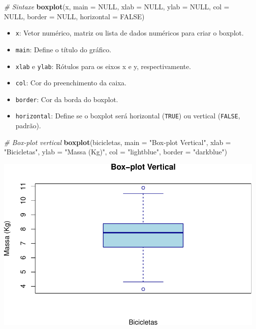 \documentclass[
]{book}
\newenvironment{Shaded}{\begin{snugshade}}{\end{snugshade}}
\newcommand{\AttributeTok}[1]{\textcolor[rgb]{0.13,0.29,0.53}{#1}}
\newcommand{\CommentTok}[1]{\textcolor[rgb]{0.56,0.35,0.01}{\textit{#1}}}
\newcommand{\ConstantTok}[1]{\textcolor[rgb]{0.56,0.35,0.01}{#1}}
\newcommand{\FunctionTok}[1]{\textcolor[rgb]{0.13,0.29,0.53}{\textbf{#1}}}
\newcommand{\NormalTok}[1]{#1}
\newcommand{\StringTok}[1]{\textcolor[rgb]{0.31,0.60,0.02}{#1}}
\providecommand{\tightlist}{%
  \setlength{\itemsep}{0pt}\setlength{\parskip}{0pt}}
\begin{document}
\begin{Shaded}
\begin{Highlighting}[]
\CommentTok{\# Sintaxe}
\FunctionTok{boxplot}\NormalTok{(x, }
        \AttributeTok{main =} \ConstantTok{NULL}\NormalTok{,}
        \AttributeTok{xlab =} \ConstantTok{NULL}\NormalTok{, }
        \AttributeTok{ylab =} \ConstantTok{NULL}\NormalTok{, }
        \AttributeTok{col =} \ConstantTok{NULL}\NormalTok{, }
        \AttributeTok{border =} \ConstantTok{NULL}\NormalTok{, }
        \AttributeTok{horizontal =} \ConstantTok{FALSE}\NormalTok{)}
\end{Highlighting}
\end{Shaded}

\begin{itemize}
\tightlist
\item
  \texttt{x}: Vetor numérico, matriz ou lista de dados numéricos para criar o boxplot.
\item
  \texttt{main}: Define o título do gráfico.
\item
  \texttt{xlab} e \texttt{ylab}: Rótulos para os eixos x e y, respectivamente.
\item
  \texttt{col}: Cor do preenchimento da caixa.
\item
  \texttt{border}: Cor da borda do boxplot.
\item
  \texttt{horizontal}: Define se o boxplot será horizontal (\texttt{TRUE}) ou vertical (\texttt{FALSE}, padrão).
\end{itemize}

\begin{Shaded}
\begin{Highlighting}[]
\CommentTok{\# Box{-}plot vertical}
\FunctionTok{boxplot}\NormalTok{(bicicletas, }
        \AttributeTok{main =} \StringTok{"Box{-}plot Vertical"}\NormalTok{,}
        \AttributeTok{xlab =} \StringTok{"Bicicletas"}\NormalTok{,}
        \AttributeTok{ylab =} \StringTok{"Massa (Kg)"}\NormalTok{,}
        \AttributeTok{col =} \StringTok{"lightblue"}\NormalTok{,}
        \AttributeTok{border =} \StringTok{"darkblue"}\NormalTok{)}
\end{Highlighting}
\end{Shaded}

\includegraphics{introR_files/figure-latex/unnamed-chunk-175-1.pdf}
\end{document}
